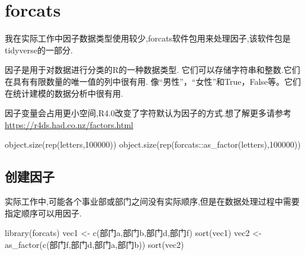 \documentclass[
]{book}
\newenvironment{Shaded}{\begin{snugshade}}{\end{snugshade}}
\newcommand{\DecValTok}[1]{\textcolor[rgb]{0.00,0.00,0.81}{#1}}
\newcommand{\FunctionTok}[1]{\textcolor[rgb]{0.00,0.00,0.00}{#1}}
\newcommand{\NormalTok}[1]{#1}
\newcommand{\OtherTok}[1]{\textcolor[rgb]{0.56,0.35,0.01}{#1}}
\newcommand{\SpecialCharTok}[1]{\textcolor[rgb]{0.00,0.00,0.00}{#1}}
\newcommand{\StringTok}[1]{\textcolor[rgb]{0.31,0.60,0.02}{#1}}
\begin{document}
\hypertarget{forcats}{%
\chapter{forcats}\label{forcats}}

我在实际工作中因子数据类型使用较少,forcats软件包用来处理因子,该软件包是tidyverse的一部分.

因子是用于对数据进行分类的R的一种数据类型. 它们可以存储字符串和整数.它们在具有有限数量的唯一值的列中很有用. 像``男性''，``女性''和True，False等。它们在统计建模的数据分析中很有用.

因子变量会占用更小空间,R4.0改变了字符默认为因子的方式.想了解更多请参考 \url{https://r4ds.had.co.nz/factors.html}

\begin{Shaded}
\begin{Highlighting}[]
\FunctionTok{object.size}\NormalTok{(}\FunctionTok{rep}\NormalTok{(letters,}\DecValTok{100000}\NormalTok{))}
\FunctionTok{object.size}\NormalTok{(}\FunctionTok{rep}\NormalTok{(forcats}\SpecialCharTok{::}\FunctionTok{as\_factor}\NormalTok{(letters),}\DecValTok{100000}\NormalTok{))}
\end{Highlighting}
\end{Shaded}

\hypertarget{ux521bux5efaux56e0ux5b50}{%
\section{创建因子}\label{ux521bux5efaux56e0ux5b50}}

实际工作中,可能各个事业部或部门之间没有实际顺序,但是在数据处理过程中需要指定顺序可以用因子.

\begin{Shaded}
\begin{Highlighting}[]
\FunctionTok{library}\NormalTok{(forcats)}
\NormalTok{vec1 }\OtherTok{\textless{}{-}} \FunctionTok{c}\NormalTok{(}\StringTok{\textquotesingle{}部门a\textquotesingle{}}\NormalTok{,}\StringTok{\textquotesingle{}部门b\textquotesingle{}}\NormalTok{,}\StringTok{\textquotesingle{}部门d\textquotesingle{}}\NormalTok{,}\StringTok{\textquotesingle{}部门f\textquotesingle{}}\NormalTok{)}
\FunctionTok{sort}\NormalTok{(vec1)}
\NormalTok{vec2 }\OtherTok{\textless{}{-}} \FunctionTok{as\_factor}\NormalTok{(}\FunctionTok{c}\NormalTok{(}\StringTok{\textquotesingle{}部门f\textquotesingle{}}\NormalTok{,}\StringTok{\textquotesingle{}部门d\textquotesingle{}}\NormalTok{,}\StringTok{\textquotesingle{}部门a\textquotesingle{}}\NormalTok{,}\StringTok{\textquotesingle{}部门b\textquotesingle{}}\NormalTok{))}
\FunctionTok{sort}\NormalTok{(vec2)}
\end{Highlighting}
\end{Shaded}
\end{document}
